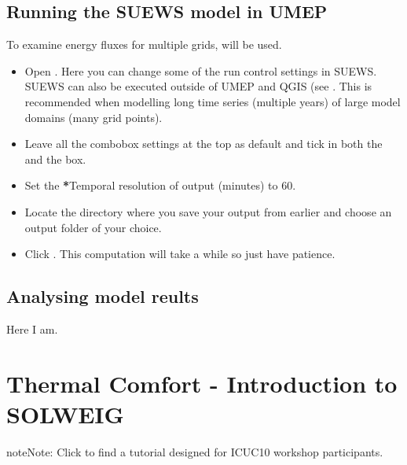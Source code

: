 \documentclass[letterpaper,10pt,english]{sphinxmanual}
\begin{document}
\subsection{Running the SUEWS model in UMEP}
\label{\detokenize{Tutorials/SuewsWUDAPT:running-the-suews-model-in-umep}}
To examine energy fluxes for multiple grids, {\hyperref[\detokenize{processor/Urban Energy Balance Urban Energy Balance (SUEWS.BLUEWS, advanced):suewsadvanced}]{}} will be used.
\begin{itemize}
\item {} 
Open . Here you can change some of the run control settings in SUEWS. SUEWS can also be executed outside of UMEP and QGIS (see . This is recommended when modelling long time series (multiple years) of large model domains (many grid points).

\item {} 
Leave all the combobox settings at the top as default and tick in both the  and the  box.

\item {} 
Set the {\color{red}\bfseries{}*}Temporal resolution of output (minutes) to 60.

\item {} 
Locate the directory where you save your output from  earlier and choose an output folder of your choice.

\item {} 
Click . This computation will take a while so just have patience.

\end{itemize}


\subsection{Analysing model reults}
\label{\detokenize{Tutorials/SuewsWUDAPT:analysing-model-reults}}
Here I am.


\section{Thermal Comfort - Introduction to SOLWEIG}
\label{\detokenize{Tutorials/IntroductionToSolweig:thermal-comfort-introduction-to-solweig}}\label{\detokenize{Tutorials/IntroductionToSolweig:introductiontosolweig}}\label{\detokenize{Tutorials/IntroductionToSolweig::doc}}
\begin{sphinxadmonition}{note}{Note:}
Click  to find a tutorial designed for ICUC10 workshop participants.
\end{sphinxadmonition}
\end{document}
